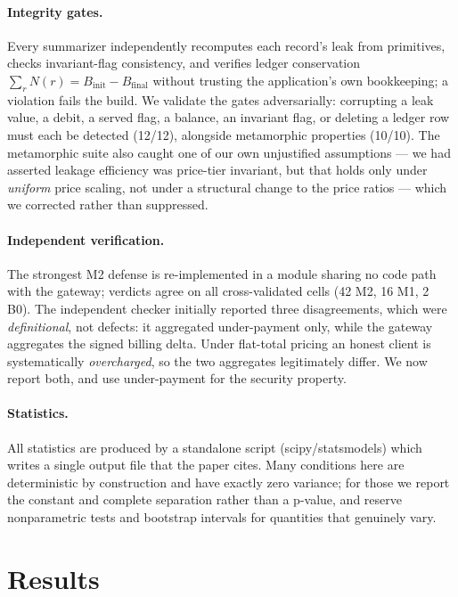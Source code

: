 \documentclass[11pt]{article}
\begin{document}
\paragraph{Integrity gates.} Every summarizer independently recomputes each record's leak
from primitives, checks invariant-flag consistency, and verifies ledger conservation
$\sum_r N(r)=B_{\text{init}}-B_{\text{final}}$ without trusting the application's own
bookkeeping; a violation fails the build. We validate the gates adversarially: corrupting
a leak value, a debit, a served flag, a balance, an invariant flag, or deleting a ledger
row must each be detected (12/12), alongside metamorphic properties (10/10). The
metamorphic suite also caught one of our own unjustified assumptions --- we had asserted
leakage efficiency was price-tier invariant, but that holds only under \emph{uniform}
price scaling, not under a structural change to the price ratios --- which we corrected
rather than suppressed.

\paragraph{Independent verification.} The strongest M2 defense is re-implemented in a
module sharing no code path with the gateway; verdicts agree on all cross-validated cells
(42 M2, 16 M1, 2 B0). The independent checker initially reported three disagreements,
which were \emph{definitional}, not defects: it aggregated under-payment only, while the
gateway aggregates the signed billing delta. Under flat-total pricing an honest client is
systematically \emph{overcharged}, so the two aggregates legitimately differ. We now
report both, and use under-payment for the security property.

\begin{sloppypar}
\paragraph{Statistics.} All statistics are produced by a standalone script
(scipy/statsmodels) which writes a single output file that the paper cites. Many
conditions here are deterministic by construction and have exactly zero variance; for
those we report the constant and complete separation rather than a p-value, and reserve
nonparametric tests and bootstrap intervals for quantities that genuinely vary.
\end{sloppypar}

\section{Results}
\label{sec:results}
\end{document}
